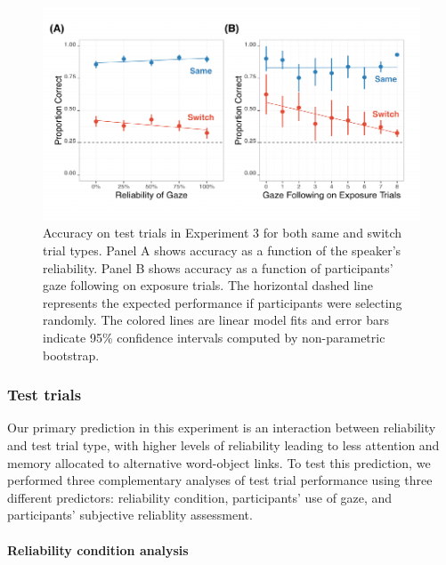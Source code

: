\documentclass[a4paper,man,natbib]{apa6}
\newenvironment{CodeChunk}{}{}
\begin{document}
\begin{CodeChunk}
\begin{figure}
\includegraphics{figs/expt3-plot-1} \caption[Accuracy on test trials in Experiment 3 for both same and switch trial types]{Accuracy on test trials in Experiment 3 for both same and switch trial types. Panel A shows accuracy as a function of the speaker's reliability. Panel B shows accuracy as a function of participants' gaze following on exposure trials. The horizontal dashed line represents the expected performance if participants were selecting randomly. The colored lines are linear model fits and error bars indicate 95\% confidence intervals computed by non-parametric bootstrap.}\label{fig:expt3-plot}
\end{figure}
\end{CodeChunk}

\subsubsection{Test trials}\label{test-trials-2}

Our primary prediction in this experiment is an interaction between
reliability and test trial type, with higher levels of reliability
leading to less attention and memory allocated to alternative
word-object links. To test this prediction, we performed three
complementary analyses of test trial performance using three different
predictors: reliability condition, participants' use of gaze, and
participants' subjective reliablity assessment.

\paragraph{Reliability condition
analysis}\label{reliability-condition-analysis}
\end{document}

